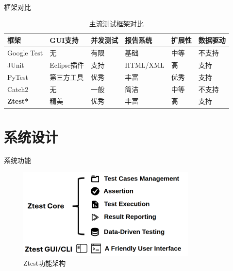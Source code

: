 \documentclass{beamer}
\begin{document}
\begin{frame}{框架对比}
    \begin{table}
        \centering
        \caption{主流测试框架对比}
        \begin{tabularx}{\textwidth}{lXXXXX}
            \toprule
            \textbf{框架}     & \textbf{GUI支持} & \textbf{并发测试} & \textbf{报告系统} & \textbf{扩展性} & \textbf{数据驱动} \\
            \midrule
            Google Test     & 无              & 有限            & 基础            & 中等           & 不支持           \\
            JUnit           & Eclipse插件      & 支持            & HTML/XML      & 高            & 支持            \\
            PyTest          & 第三方工具          & 优秀            & 丰富            & 优秀           & 支持            \\
            Catch2          & 无              & 一般            & 简洁            & 中等           & 不支持           \\
            \textbf{Ztest*} & 精美             & 优秀            & 丰富            & 高            & 支持            \\
            \bottomrule
        \end{tabularx}
    \end{table}
\end{frame}

\section{系统设计}
\begin{frame}{系统功能}
    \begin{figure}
        \centering
        \includegraphics[width=0.8\textwidth]{img/func.png}
        \caption{Ztest功能架构}
    \end{figure}
\end{frame}
\end{document}
